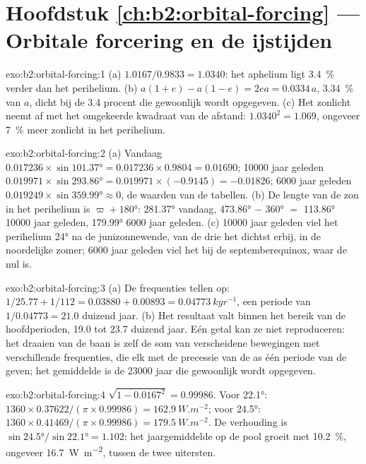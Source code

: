 \section*{Hoofdstuk \ref{ch:b2:orbital-forcing} --- Orbitale forcering en de ijstijden}

\begin{solution}{exo:b2:orbital-forcing:1}
(a) $1.0167/0.9833 = 1.0340$: het aphelium ligt \qty{3.4}{\percent} verder dan het perihelium.
(b) $a(1 + e) - a(1 - e) = 2ea = 0.0334\,a$, \qty{3.34}{\percent} van $a$, dicht bij de 3.4 procent
die gewoonlijk wordt opgegeven. (c) Het zonlicht neemt af met het omgekeerde kwadraat van de afstand: $1.0340^2 = 1.069$,
ongeveer \qty{7}{\percent} meer zonlicht in het perihelium.
\end{solution}

\begin{solution}{exo:b2:orbital-forcing:2}
(a) Vandaag $0.017236 \times \sin\ang{101.37} = 0.017236 \times 0.9804 = 0.01690$; \num{10000} jaar geleden
$0.019971 \times \sin\ang{293.86} = 0.019971 \times (-0.9145) = -0.01826$; \num{6000} jaar geleden
$0.019249 \times \sin\ang{359.99} \approx 0$, de waarden van de tabellen. (b) De lengte van de zon in het
perihelium is $\varpi + \ang{180}$: \ang{281.37} vandaag, \ang{473.86} $-$ \ang{360} $=$ \ang{113.86}
\num{10000} jaar geleden, \ang{179.99} \num{6000} jaar geleden. (c) \num{10000} jaar geleden viel het perihelium
\ang{24} na de junizonnewende, van de drie het dichtst erbij, in de noordelijke zomer;
\num{6000} jaar geleden viel het bij de septemberequinox, waar de  nul is.
\end{solution}

\begin{solution}{exo:b2:orbital-forcing:3}
(a) De frequenties tellen op: $1/25.77 + 1/112 = 0.03880 + 0.00893 = \qty{0.04773}{kyr^{-1}}$, een periode
van $1/0.04773 = 21.0$ duizend jaar. (b) Het resultaat valt binnen het bereik van de hoofdperioden,
19.0 tot 23.7 duizend jaar. Eén getal kan ze niet reproduceren: het draaien van de baan
is zelf de som van verscheidene bewegingen met verschillende frequenties, die elk met de
precessie van de as één periode van de  geven; het gemiddelde is de
\num{23000} jaar die gewoonlijk wordt opgegeven.
\end{solution}

\begin{solution}{exo:b2:orbital-forcing:4}
$\sqrt{1 - 0.0167^2} = 0.99986$. Voor \ang{22.1}: $1360 \times 0.37622/(\pi \times 0.99986) =
\qty{162.9}{W.m^{-2}}$; voor \ang{24.5}: $1360 \times 0.41469/(\pi \times 0.99986) =
\qty{179.5}{W.m^{-2}}$. De verhouding is $\sin\ang{24.5}/\sin\ang{22.1} = 1.102$: het jaargemiddelde op de
pool groeit met \qty{10.2}{\percent}, ongeveer \qty{16.7}{W.m^{-2}}, tussen de twee uitersten.
\end{solution}

